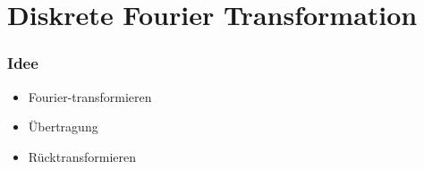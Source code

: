 \documentclass[11pt,aspectratio=169]{beamer}
\begin{document}

\section{Diskrete Fourier Transformation}
	\begin{frame}
		\frametitle{Idee}
		\begin{itemize}
			\item Fourier-transformieren
			\item Übertragung
			\item Rücktransformieren
		\end{itemize}
	\end{frame}
	\begin{frame}
		\begin{figure}
\end{figure}
\end{frame}
\end{document}
